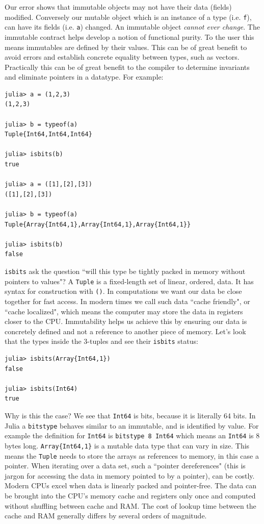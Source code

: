 Our error shows that immutable objects may not have their data (fields)
modified. Conversely our mutable
object which is an instance of a type (i.e. \texttt{f}), can have its fields
(i.e. \texttt{a}) changed. An immutable object \emph{cannot ever change}.
The immutable contract helps develop
a notion of functional purity. To the user this means immutables are defined
by their values. This can be of great benefit to avoid errors and establish
concrete equality between types, such as vectors.
Practically this can be of great benefit to
the compiler to determine invariants and eliminate pointers in a datatype.
For example:
\begin{lstlisting}
julia> a = (1,2,3)
(1,2,3)

julia> b = typeof(a)
Tuple{Int64,Int64,Int64}

julia> isbits(b)
true

julia> a = ([1],[2],[3])
([1],[2],[3])

julia> b = typeof(a)
Tuple{Array{Int64,1},Array{Int64,1},Array{Int64,1}}

julia> isbits(b)
false
\end{lstlisting}

\texttt{isbits} ask the question ``will this type be tightly packed in memory
without pointers to values"? A
\texttt{Tuple} is a fixed-length set of linear, ordered, data. It has syntax for
construction with \texttt{()}. In computations we want our data be close together
for fast access. In modern times we call such data ``cache friendly", or
``cache localized", which means the computer may store the data in
registers closer to the CPU.
Immutability helps us achieve this by ensuring our data is concretely
defined and not a reference to another piece of memory. Let's look that the
types inside the 3-tuples and see their \texttt{isbits} status:
\begin{lstlisting}
julia> isbits(Array{Int64,1})
false

julia> isbits(Int64)
true
\end{lstlisting}
Why is this the case? We see that \texttt{Int64} is bits, because it is literally
64 bits. In Julia a \texttt{bitstype} behaves similar to an immutable, and is identified
by value. For example the definition for \texttt{Int64} is \texttt{bitstype 8 Int64}
which means an \texttt{Int64} is 8 bytes long.
\texttt{Array\{Int64,1\}} is a mutable data type that can vary in size.
This means
the \texttt{Tuple} needs to store the arrays as references to memory,
in this case a
pointer. When iterating over a data set, such a ``pointer dereferences" (this is
jargon for accessing the data in memory pointed to by a pointer), can be costly.
Modern CPUs excel when data is linearly packed and pointer-free. The
data can be brought into the CPU's memory cache and registers only once
and computed without
shuffling between cache and RAM. The cost of lookup time between the cache and
RAM generally differs by several orders of magnitude.

